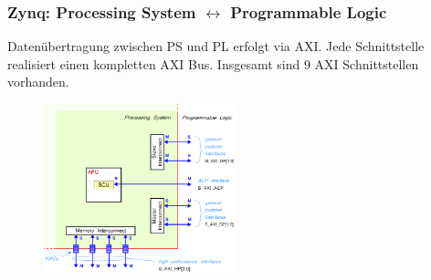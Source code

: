 \subsubsection{Zynq: Processing System $\leftrightarrow$ Programmable Logic}
\begin{multicols}{2}
  Datenübertragung zwischen PS und PL erfolgt via AXI. Jede Schnittstelle realisiert einen kompletten AXI Bus. Insgesamt sind 9 AXI Schnittstellen vorhanden.
  \begin{figure}[H]
   	\includegraphics[width=0.5\textwidth]{images/AXI_PL_PS.png}
   \end{figure}
\end{multicols}
